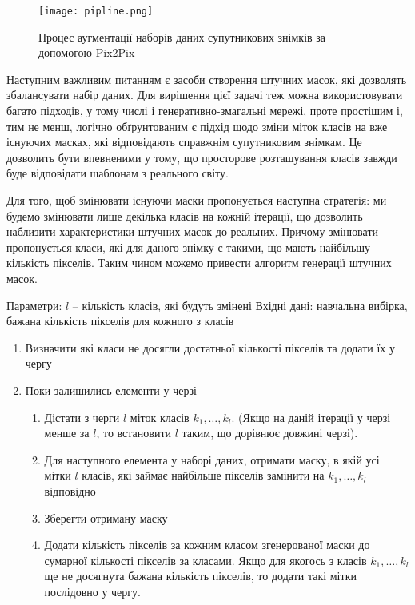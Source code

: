 \begin{figure}[!ht]
    \centering
    \texttt{[image: pipline.png]}
    \caption{Процес аугментації наборів даних супутникових знімків за допомогою Pix2Pix}
    \label{fig:pipline}
\end{figure}

Наступним важливим питанням є засоби створення штучних масок,
які дозволять збалансувати набір даних. Для вирішення цієї
задачі теж можна використовувати багато підходів, у тому числі і
генеративно-змагальні мережі, проте простішим і, тим не менш,
логічно обґрунтованим є підхід щодо зміни міток класів на вже
існуючих масках, які відповідають справжнім супутниковим знімкам.
Це дозволить бути впевненими у тому, що просторове розташування
класів завжди буде відповідати шаблонам з реального світу.

Для того, щоб змінювати існуючи маски пропонується наступна
стратегія: ми будемо змінювати лише декілька класів на кожній ітерації, що
дозволить наблизити характеристики штучних масок до реальних.
Причому змінювати пропонується класи, які для даного знімку є такими,
що мають найбільшу кількість пікселів. Таким чином можемо
привести алгоритм генерації штучних масок.

\begin{algorithm} \label{alg:mask_gen} \leavevmode \linebreak
    Параметри: $l$ -- кількість класів, які будуть змінені
    Вхідні дані: навчальна вибірка, бажана кількість пікселів для кожного з класів
    \begin{enumerate}
        \item Визначити які класи не досягли достатньої кількості пікселів та додати їх у чергу
        \item Поки залишились елементи у черзі

              \begin{enumerate}
                  \item Дістати з черги $l$ міток класів $k_1, \dots, k_l$. (Якщо на даній ітерації
                        у черзі менше за $l$, то встановити $l$ таким, що дорівнює
                        довжині черзі).
                  \item Для наступного елемента у наборі даних, отримати маску,
                        в якій усі мітки $l$ класів, які займає найбільше пікселів замінити
                        на $k_1, \dots, k_l$ відповідно
                  \item Зберегти отриману маску
                  \item Додати кількість пікселів за кожним класом згенерованої
                        маски до сумарної кількості пікселів за класами.
                        Якщо для якогось з класів $k_1, \dots, k_l$ ще не досягнута бажана
                        кількість пікселів, то додати такі мітки послідовно у чергу.
              \end{enumerate}
    \end{enumerate}
\end{algorithm}

